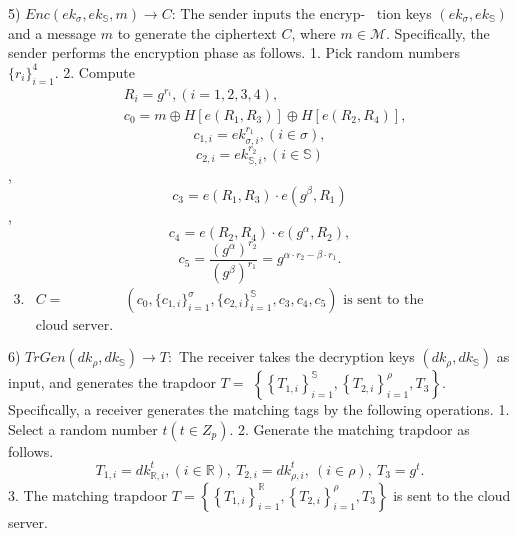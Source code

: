 \documentclass[runningheads]{llncs}
\begin{document}
5) $Enc( ek_\sigma , ek_\mathbb{S} , m) \to C{: \text{ The sender inputs the encryp- }}$ tion keys $(ek_\sigma,ek_\mathbb{S})$ and a message $m$ to generate the ciphertext $C$, where $m\in \mathcal{M} .$ Specifically, the sender performs the encryption phase as follows.
1. Pick random numbers $\{ r_i\} _{i= 1}^4.$ 2. Compute
$$\begin{aligned}&R_{i}=g^{r_i},(i=1,2,3,4),\\&c_{0}=m\oplus H[e(R_1,R_3)]\oplus H[e(R_2,R_4)],\end{aligned}$$
$$c_{1,i}=ek_{\sigma,i}^{r_1},(i\in\sigma),$$
$$c_{2,i}=ek_{\mathbb{S},i}^{r_2},(i\in\mathbb{S})$$,
$$c_3=e(R_1,R_3)\cdot e(g^\beta,R_1)$$,
$$c_4=e(R_2,R_4)\cdot e(g^\alpha,R_2),$$
$$c_5=\frac{(g^\alpha)^{r_2}}{(g^\beta)^{r_1}}=g^{\alpha\cdot r_2-\beta\cdot r_1}.$$
$\begin{array}{ll}3.&C=&(c_0,\{c_{1,i}\}_{i=1}^\sigma,\{c_{2,i}\}_{i=1}^\mathbb{S},c_3,c_4,c_5)\text{ is sent to the}\\&\text{cloud server.}\end{array}$

6) $TrGen( dk_\rho , dk_{\mathbb{S} }) \to T{: }$ The receiver takes the decryption keys $(dk_\rho,dk_\mathbb{S})$ as input, and generates the trapdoor $T=$ $\left\{\left\{T_{1,i}\right\}_{i=1}^{\mathbb{S}},\left\{T_{2,i}\right\}_{i=1}^{\rho},T_3\right\}.$ Specifıcally, a receiver generates the matching tags by the following operations. 1. Select a random number $t(t\in Z_p).$ 2. Generate the matching trapdoor as follows.
$$T_{1,i}=dk_{\mathbb{R},i}^t,(i\in\mathbb{R}),\:T_{2,i}=dk_{\rho,i}^t,\:(i\in\rho),\:T_3=g^t.$$
3. The matching trapdoor $T=\left\{\left\{T_{1,i}\right\}_{i=1}^{\mathbb{R}},\left\{T_{2,i}\right\}_{i=1}^{\rho},T_{3}\right\}$ is sent to the cloud server.
\end{document}
